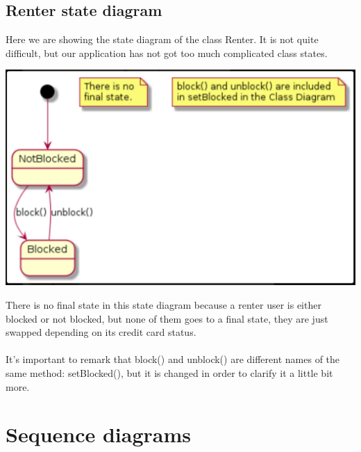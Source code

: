 \documentclass[12pt]{article}
\begin{document}
\subsection{Renter state diagram}
Here we are showing the state diagram of the class Renter. It is not quite difficult, but our application has not got too much complicated class states.
\begin{center}
	\includegraphics[scale=1]{states1.PNG}
\end{center}
There is no final state in this state diagram because a renter user is either blocked or not blocked, but none of them goes to a final state, they are just swapped depending on its credit card status.\\\\
It's important to remark that block() and unblock() are different names of the same method: setBlocked(), but it is changed in order to clarify it a little bit more.

\section{Sequence diagrams}
\end{document}
